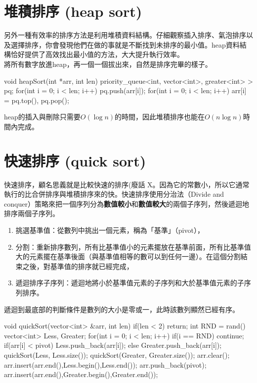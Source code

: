 \documentclass[main.tex]{subfiles}
\begin{document}
\section{堆積排序 (heap sort)}
另外一種有效率的排序方法是利用堆積資料結構。仔細觀察插入排序、氣泡排序以及選擇排序，你會發現他們在做的事就是不斷找到未排序的最小值。heap資料結構恰好提供了高效找出最小值的方法，大大提升執行效率。\\
\indent 將所有數字放進heap，再一個一個拔出來，自然是排序完畢的樣子。
\begin{C++}
void heapSort(int *arr, int len){
    priority_queue<int, vector<int>, greater<int> > pq;
    for(int i = 0; i < len; i++)
        pq.push(arr[i]);
    for(int i = 0; i < len; i++)
        arr[i] = pq.top(), pq.pop();
}
\end{C++}
heap的插入與刪除只需要$O(\log n)$的時間，因此堆積排序也能在$O(n\log n)$時間內完成。
\section{快速排序 (quick sort)}
快速排序，顧名思義就是比較快速的排序(廢話 X。因為它的常數小，所以它通常執行的比合併排序與堆積排序來的快。快速排序使用分治法（Divide and conquer）策略來把一個序列分為\textbf{數值較小}和\textbf{數值較大}的兩個子序列，然後遞迴地排序兩個子序列。\\
\begin{enumerate}
\item 挑選基準值：從數列中挑出一個元素，稱為「基準」（pivot），
\item 分割：重新排序數列，所有比基準值小的元素擺放在基準前面，所有比基準值大的元素擺在基準後面（與基準值相等的數可以到任何一邊）。在這個分割結束之後，對基準值的排序就已經完成，
\item 遞迴排序子序列：遞迴地將小於基準值元素的子序列和大於基準值元素的子序列排序。
\end{enumerate}
遞迴到最底部的判斷條件是數列的大小是零或一，此時該數列顯然已經有序。
\begin{C++}
void quickSort(vector<int> &arr, int len){
    if(len < 2) return;
    int RND = rand()%
    vector<int> Less, Greater;
    for(int i = 0; i < len; i++){
        if(i == RND) continue;
        if(arr[i] < pivot)
            Less.push_back(arr[i]);
        else Greater.push_back(arr[i]);
    }
    quickSort(Less, Less.size());
    quickSort(Greater, Greater.size());
    arr.clear();
    arr.insert(arr.end(),Less.begin(),Less.end());
    arr.push_back(pivot);
    arr.insert(arr.end(),Greater.begin(),Greater.end());
}
\end{C++}
\end{document}

